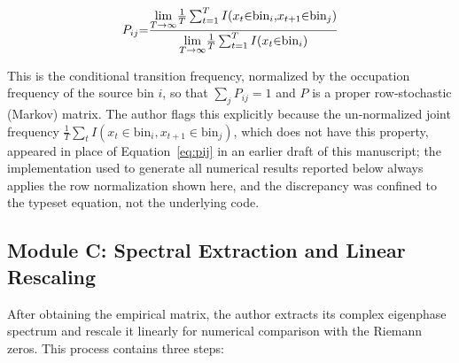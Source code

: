 \documentclass[mca,article,submit,oneauthor,pdftex]{Definitions/mdpi}
\begin{document}
\begin{equation}\label{eq:pij}
{P}_{{ij}}\text{=}\frac{\underset{{T}\text{\ensuremath{\rightarrow}\ensuremath{\infty}}}{\text{lim}}\frac{\text{1}}{{T}}\sum_{{t}\text{=1}}^{{T}}{I}\text{(}{x}_{{t}}\text{\ensuremath{\in}}\text{bin}_{{i}}\text{,}{x}_{{t}\text{+1}}\text{\ensuremath{\in}}\text{bin}_{{j}}\text{)}}{\underset{{T}\text{\ensuremath{\rightarrow}\ensuremath{\infty}}}{\text{lim}}\frac{\text{1}}{{T}}\sum_{{t}\text{=1}}^{{T}}{I}\text{(}{x}_{{t}}\text{\ensuremath{\in}}\text{bin}_{{i}}\text{)}}
\end{equation}

This is the conditional transition frequency, normalized by the occupation
frequency of the source bin $i$, so that $\sum_j P_{ij}=1$ and $P$ is a
proper row-stochastic (Markov) matrix. The author flags this explicitly because the
un-normalized joint frequency
$\frac{1}{T}\sum_t I(x_t\in\text{bin}_i,x_{t+1}\in\text{bin}_j)$, which does
not have this property, appeared in place of Equation~\eqref{eq:pij} in an
earlier draft of this manuscript; the implementation used to generate all
numerical results reported below always applies the row normalization
shown here, and the discrepancy was confined to the typeset equation, not
the underlying code.

\subsection{Module C: Spectral Extraction and Linear Rescaling}

After obtaining the empirical matrix, the author extracts its complex eigenphase
spectrum and rescale it linearly for numerical comparison with the Riemann
zeros. This process contains three steps:
\end{document}
